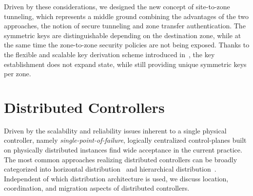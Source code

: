Driven by these considerations, we designed the new concept of site-to-zone tunneling,
which represents a middle ground combining the advantages of the two approaches, the
notion of secure tunneling and zone transfer authentication. The symmetric keys
are distinguishable depending on the destination zone, while at the same time the
zone-to-zone security policies are not being exposed. Thanks to the flexible and scalable key derivation scheme introduced in~\cite{rot2020piskes}, the key establishment does not expand
state, while still providing unique symmetric keys per zone.




\section{Distributed Controllers}
\label{sec:distributedcontroller}
Driven by the scalability and reliability issues inherent to a single physical controller,
namely \textit{single-point-of-failure}, logically centralized control-planes built on
physically distributed instances find wide acceptance in the current practice. The most
common approaches realizing distributed controllers can be broadly categorized into
horizontal distribution~\cite{berde2014onos,medved2014opendaylight} and hierarchical
distribution~\cite{hassas2012kandoo,yap2017taking}. Independent of which distribution
architecture is used, we discuss location, coordination, and migration aspects of distributed
controllers.

